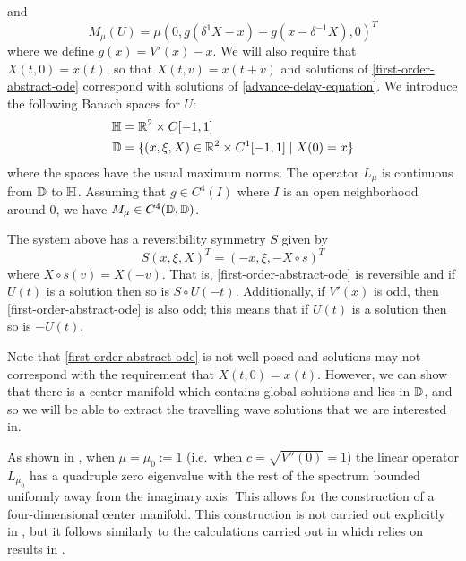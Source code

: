 and 
\begin{equation}
	M_\mu(U) = \mu (0, g(\delta^1X -x) - g(x- \delta^{-1} X), 0)^T
\end{equation}
where we define \(g(x)= V'(x) - x\). We will also require that \(X(t,0) = x(t)\), so that \(X(t,v) = x(t+v)\) and solutions of \cref{first-order-abstract-ode} correspond with solutions of \cref{advance-delay-equation}. We introduce the following Banach spaces for \(U\):
\begin{equation}
	\begin{aligned}
		\mathbb{H} &= \mathbb{R}^2 \times C[-1,1] \\
		\mathbb{D} &= \{(x, \xi, X) \in \mathbb{R}^2 \times C^1[-1,1] \mid X(0) = x\}
	\end{aligned}
\end{equation}
where the spaces have the usual maximum norms. The operator \(L_\mu\) is continuous from \(\mathbb{D}\) to \(\mathbb{H}\). Assuming that \(g\in C^4(I)\) where \(I\) is an open neighborhood around \(0\), we have \(M_\mu \in C^4(\mathbb{D},\mathbb{D})\).

The system above has a reversibility symmetry \(S\) given by 
\begin{equation}
	S(x, \xi, X)^T = (-x, \xi, -X \circ s)^T
\end{equation}
where \(X\circ s (v) = X(-v)\). That is, \cref{first-order-abstract-ode} is reversible and if \(U(t)\) is a solution then so is \(S\circ U(-t)\). Additionally, if \(V'(x)\) is odd, then \cref{first-order-abstract-ode} is also odd; this means that if \(U(t)\) is a solution then so is \(-U(t)\).

Note that \cref{first-order-abstract-ode} is not well-posed and solutions may not correspond with the requirement that \(X(t,0) = x(t)\). However, we can show that there is a center manifold which contains global solutions and lies in \(\mathbb{D}\), and so we will be able to extract the travelling wave solutions that we are interested in.

As shown in \cite[Lem.\ 1]{iooss2000travelling}, when \(\mu = \mu_0:= 1\) (i.e.\ when \(c = \sqrt{V''(0)} = 1\)) the linear operator \(L_{\mu_0}\) has a quadruple zero eigenvalue with the rest of the spectrum bounded uniformly away from the imaginary axis. This allows for the construction of a four-dimensional center manifold. This construction is not carried out explicitly in \cite{iooss2000travelling}, but it follows similarly to the calculations carried out in \cite{iooss2000travelling2} which relies on results in \cite{vanderbauwhede1992center}.

